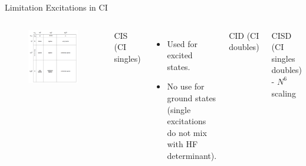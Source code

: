 \documentclass[aspectratio=169]{beamer}
\begin{document}
    \begin{frame}{Limitation Excitations in CI}
        \begin{columns}
            \begin{figure}
                \centering
                \includegraphics[width=0.8\linewidth]{lectures/figures/3_CI_excitations.png}
            \end{figure}
            CIS (CI singles)
            \begin{itemize}
                \item Used for excited states.
                \item No use for ground states (single excitations do not mix with HF determinant).
            \end{itemize}

            CID (CI doubles)

            CISD (CI singles doubles) - $N^6$ scaling

        \end{columns}

    \end{frame}
\end{document}
